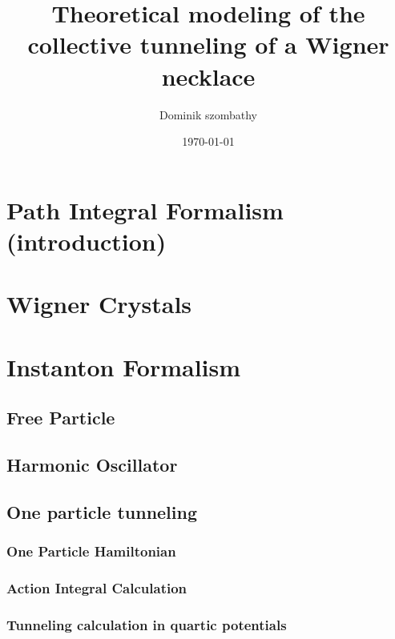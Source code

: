 

\title{Theoretical modeling of the collective tunneling of a Wigner necklace\\}
\author{Dominik szombathy}
\date{\today}



\maketitle

\begin{abstract}

\end{abstract}

\tableofcontents

\pagestyle{plain}

\newpage
\section{Path Integral Formalism (introduction)}

\newpage
\section{Wigner Crystals}

\newpage
\section{Instanton Formalism}
	\subsection{Free Particle}
	\subsection{Harmonic Oscillator}
	\subsection{One particle tunneling}
		\subsubsection{One Particle Hamiltonian}
		\subsubsection{Action Integral Calculation}
		\subsubsection{Tunneling calculation in quartic potentials}

